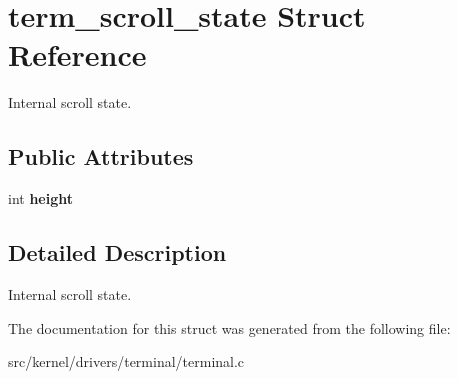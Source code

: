 \hypertarget{structterm__scroll__state}{}\section{term\+\_\+scroll\+\_\+state Struct Reference}
\label{structterm__scroll__state}


Internal scroll state.  


\subsection*{Public Attributes}
\begin{DoxyCompactItemize}
\item 
\mbox{\label{structterm__scroll__state_aa110afe7bcbddb1c8f6c07da287a51ff}} 
int {\bfseries height}
\end{DoxyCompactItemize}


\subsection{Detailed Description}
Internal scroll state. 

The documentation for this struct was generated from the following file\+:\begin{DoxyCompactItemize}
\item 
src/kernel/drivers/terminal/terminal.\+c\end{DoxyCompactItemize}
